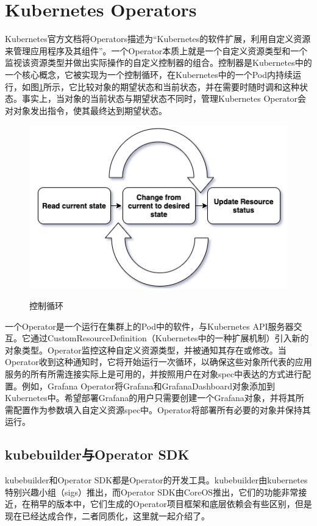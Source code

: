 \documentclass[macfonts,master]{njuthesis}
\begin{document}
\section{Kubernetes Operators}
Kubernetes官方文档将Operators描述为“Kubernetes的软件扩展，利用自定义资源来管理应用程序及其组件”\cite{k8soperator}。一个Operator本质上就是一个自定义资源类型和一个监视该资源类型并做出实际操作的自定义控制器的组合。控制器是Kubernetes中的一个核心概念，它被实现为一个控制循环，在Kubernetes中的一个Pod内持续运行，如图\ref{fig:reconciliation-loop}所示，它比较对象的期望状态和当前状态，并在需要时随时调和这种状态。事实上，当对象的当前状态与期望状态不同时，管理Kubernetes Operator会对对象发出指令，使其最终达到期望状态。

\begin{figure}[htbp]
  \centering
  \includegraphics[width= 1\textwidth]{pics/reconcile-loop.png}\\
  \caption{控制循环}\label{fig:reconciliation-loop}
\end{figure}

一个Operator是一个运行在集群上的Pod中的软件，与Kubernetes API服务器交互。它通过CustomResourceDefinition（Kubernetes中的一种扩展机制）引入新的对象类型。Operator监控这种自定义资源类型，并被通知其存在或修改。当Operator收到这种通知时，它将开始运行一次循环，以确保这些对象所代表的应用服务的所有所需连接实际上是可用的，并按照用户在对象spec中表达的方式进行配置。例如，Grafana Operator将Grafana和GrafanaDashboard对象添加到Kubernetes中。希望部署Grafana的用户只需要创建一个Grafana对象，并将其所需配置作为参数填入自定义资源spec中。Operator将部署所有必要的对象并保持其运行。

\subsection{kubebuilder与Operator SDK}
kubebuilder和Operator SDK都是Operator的开发工具。kubebuilder由kubernetes特别兴趣小组（sigs）推出，而Operator SDK由CoreOS推出，它们的功能非常接近，在稍早的版本中，它们生成的Operator项目框架和底层依赖会有些区别，但是现在已经达成合作，二者同质化，这里就一起介绍了。
\end{document}
